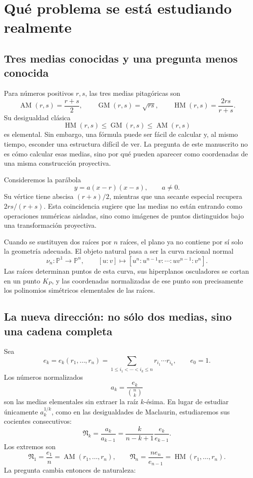 \documentclass[11pt,oneside]{scrartcl}
\theoremstyle{plainblue}
\theoremstyle{definitionblue}
\theoremstyle{remarkgray}
\newcommand{\PP}{\mathbb{P}}
\newcommand{\AM}{\operatorname{AM}}
\newcommand{\GM}{\operatorname{GM}}
\newcommand{\HM}{\operatorname{HM}}
\newcommand{\cN}{\mathfrak{N}}
\begin{document}
\clearpage
{}

\section{Qué problema se está estudiando realmente}

\subsection{Tres medias conocidas y una pregunta menos conocida}

Para números positivos \(r,s\), las tres medias pitagóricas son
\[
\AM(r,s)=\frac{r+s}{2},\qquad
\GM(r,s)=\sqrt{rs},\qquad
\HM(r,s)=\frac{2rs}{r+s}.
\]
Su desigualdad clásica
\[
\HM(r,s)\le \GM(r,s)\le \AM(r,s)
\]
es elemental. Sin embargo, una fórmula puede ser fácil de calcular y, al mismo
tiempo, esconder una estructura difícil de ver. La pregunta de este manuscrito no es
cómo calcular esas medias, sino por qué pueden aparecer como coordenadas de una
misma construcción proyectiva.

Consideremos la parábola
\[
y=a(x-r)(x-s),\qquad a\ne 0.
\]
Su vértice tiene abscisa \((r+s)/2\), mientras que una secante especial recupera
\(2rs/(r+s)\). Esta coincidencia sugiere que las medias no están entrando como
operaciones numéricas aisladas, sino como imágenes de puntos distinguidos bajo una
transformación proyectiva.

Cuando se sustituyen dos raíces por \(n\) raíces, el plano ya no contiene por sí solo
la geometría adecuada. El objeto natural pasa a ser la curva racional normal
\[
\nu_n:\PP^1\longrightarrow\PP^n,
\qquad
[u:v]\longmapsto[u^n:u^{n-1}v:\cdots:uv^{n-1}:v^n].
\]
Las raíces determinan puntos de esta curva, sus hiperplanos osculadores se cortan en
un punto \(K_P\), y las coordenadas normalizadas de ese punto son precisamente los
polinomios simétricos elementales de las raíces.

\subsection{La nueva dirección: no sólo dos medias, sino una cadena completa}

Sea
\[
e_k=e_k(r_1,\dots,r_n)
=\sum_{1\le i_1<\cdots<i_k\le n}r_{i_1}\cdots r_{i_k},
\qquad e_0=1.
\]
Los números normalizados
\[
a_k=\frac{e_k}{\binom nk}
\]
son las medias elementales sin extraer la raíz \(k\)-ésima. En lugar de estudiar
únicamente \(a_k^{1/k}\), como en las desigualdades de Maclaurin, estudiaremos sus
cocientes consecutivos:
\begin{equation}\label{eq:def-Nk-intro}
\cN_k=\frac{a_k}{a_{k-1}}
=\frac{k}{n-k+1}\frac{e_k}{e_{k-1}}.
\end{equation}
Los extremos son
\[
\cN_1=\frac{e_1}{n}=\AM(r_1,\dots,r_n),
\qquad
\cN_n=\frac{ne_n}{e_{n-1}}=\HM(r_1,\dots,r_n).
\]
La pregunta cambia entonces de naturaleza:
\end{document}

